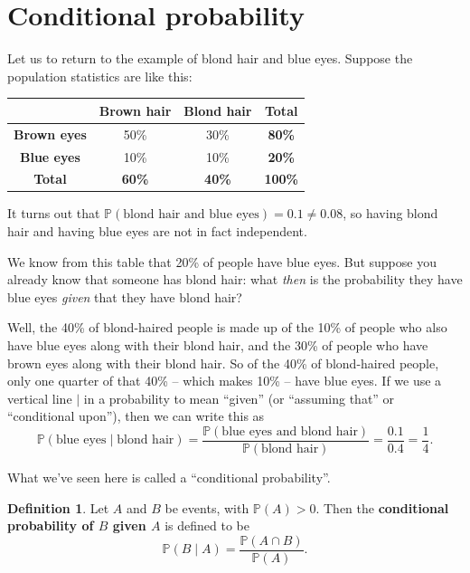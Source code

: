 \documentclass[
  a4paper,
]{book}
\theoremstyle{definition}
\newtheorem{definition}{Definition}[chapter]
\theoremstyle{definition}
\theoremstyle{definition}
\theoremstyle{definition}
\theoremstyle{remark}
\begin{document}
\hypertarget{conditional}{%
\section{Conditional probability}\label{conditional}}

Let us to return to the example of blond hair and blue eyes. Suppose the population statistics are like this:

\begin{longtable}[]{@{}cccc@{}}
\toprule()
& \textbf{Brown hair} & \textbf{Blond hair} & \textbf{Total} \\
\midrule()
\endhead
\textbf{Brown eyes} & 50\% & 30\% & \textbf{80\%} \\
\textbf{Blue eyes} & 10\% & 10\% & \textbf{20\%} \\
\textbf{Total} & \textbf{60\%} & \textbf{40\%} & \textbf{100\%} \\
\bottomrule()
\end{longtable}

It turns out that \(\mathbb P(\text{blond hair and blue eyes}) = 0.1 \neq 0.08\), so having blond hair and having blue eyes are not in fact independent.

We know from this table that 20\% of people have blue eyes. But suppose you already know that someone has blond hair: what \emph{then} is the probability they have blue eyes \emph{given} that they have blond hair?

Well, the 40\% of blond-haired people is made up of the 10\% of people who also have blue eyes along with their blond hair, and the 30\% of people who have brown eyes along with their blond hair. So of the 40\% of blond-haired people, only one quarter of that 40\% -- which makes 10\% -- have blue eyes. If we use a vertical line \(|\) in a probability to mean ``given'' (or ``assuming that'' or ``conditional upon''), then we can write this as
\[  \mathbb P(\text{blue eyes} \mid \text{blond hair}) = \frac{\mathbb P(\text{blue eyes and blond hair})}{\mathbb P(\text{blond hair})} = \frac{0.1}{0.4} = \frac14. \]

What we've seen here is called a ``conditional probability''.

\begin{definition}
Let \(A\) and \(B\) be events, with \(\mathbb P(A) > 0\). Then the \textbf{conditional probability of \(B\) given \(A\)} is defined to be
\[  \mathbb P(B \mid A) = \frac{\mathbb P(A \cap B)}{\mathbb P(A)} . \]
\end{definition}
\end{document}
